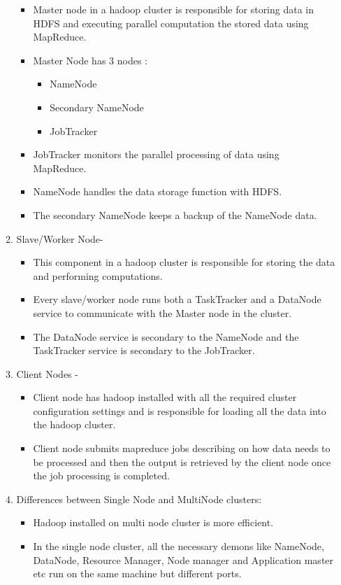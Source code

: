 \documentclass[a4paper,10pt]{article}
\begin{document}
\begin{enumerate}
\begin{enumerate}
\begin{itemize}
		\item Master node in a hadoop cluster is responsible for storing data in HDFS and executing parallel computation the stored data using MapReduce.
		\item Master Node has 3 nodes :
		\begin{itemize} 
			\item NameNode
			\item Secondary NameNode 
			\item JobTracker
		\end{itemize} 
		\item JobTracker monitors the parallel processing of data using MapReduce.
		\item NameNode handles the data storage function with HDFS. \item The secondary NameNode keeps a backup of the NameNode data.
	\end{itemize}
	\item 	Slave/Worker Node- 
	\begin{itemize}
		\item This component in a hadoop cluster is responsible for storing the data and performing computations. 
		\item Every slave/worker node runs both a TaskTracker and a DataNode service to communicate with the Master node in the cluster. 
		\item The DataNode service is secondary to the NameNode and the TaskTracker service is secondary to the JobTracker.
	\end{itemize}
	\item Client Nodes - 
	\begin{itemize}
		\item Client node has hadoop installed with all the required cluster configuration settings and is responsible for loading all the data into the hadoop cluster. 
		\item Client node submits mapreduce jobs describing on how data needs to be processed and then the output is retrieved by the client node once the job processing is completed.
	\end{itemize}
	\item Differences between Single Node and MultiNode clusters:
	\begin{itemize}
		\item Hadoop installed on multi node cluster is more efficient.
		\item In the single node cluster, all the necessary demons like NameNode, DataNode, Resource Manager, Node manager and Application master etc run on the same machine but different ports.

\end{itemize}
\end{enumerate}
\end{enumerate}
\end{document}
